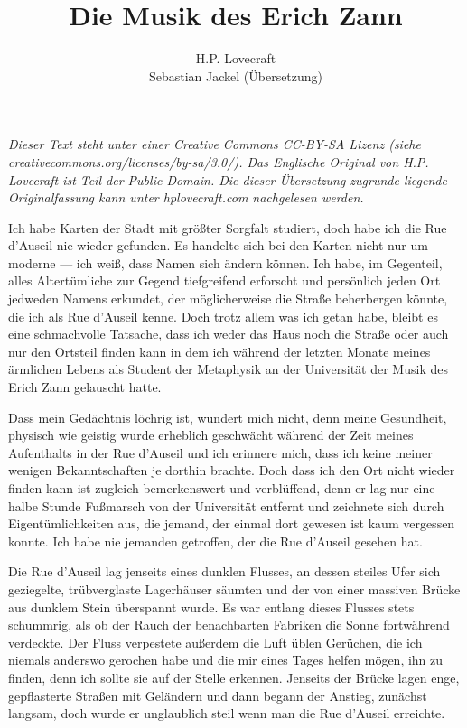 \documentclass[a4paper]{memoir}
\begin{document}
\title{Die Musik des Erich Zann}
\author{H.P. Lovecraft\\
		Sebastian Jackel (Übersetzung)}
\date{}
\maketitle

\textit{Dieser Text steht unter einer Creative Commons CC-BY-SA Lizenz
(siehe\\ creativecommons.org/licenses/by-sa/3.0/). Das Englische Original von H.P. Lovecraft ist Teil der Public Domain. Die dieser Übersetzung zugrunde liegende Originalfassung kann unter hplovecraft.com nachgelesen werden.}

\vspace{12pt}

Ich habe Karten der Stadt mit größter Sorgfalt studiert, doch habe ich die Rue d'Auseil nie wieder gefunden. Es handelte sich bei den Karten nicht nur um moderne --- ich weiß, dass Namen sich ändern können. Ich habe, im Gegenteil, alles Altertümliche zur Gegend tiefgreifend erforscht und persönlich jeden Ort jedweden Namens erkundet, der möglicherweise die Straße beherbergen könnte, die ich als Rue d'Auseil kenne. Doch trotz allem was ich getan habe, bleibt es eine schmachvolle Tatsache, dass ich weder das Haus noch die Straße oder auch nur den Ortsteil finden kann in dem ich während der letzten Monate meines ärmlichen Lebens als Student der Metaphysik an der Universität der Musik des Erich Zann gelauscht hatte.

Dass mein Gedächtnis löchrig ist, wundert mich nicht, denn meine Gesundheit, physisch wie geistig wurde erheblich geschwächt während der Zeit meines Aufenthalts in der Rue d'Auseil und ich erinnere mich, dass ich keine meiner wenigen Bekanntschaften je dorthin brachte. Doch dass ich den Ort nicht wieder finden kann ist zugleich bemerkenswert und verblüffend, denn er lag nur eine halbe Stunde Fußmarsch von der Universität entfernt und zeichnete sich durch Eigentümlichkeiten aus, die jemand, der einmal dort gewesen ist kaum vergessen konnte. Ich habe nie jemanden getroffen, der die Rue d'Auseil gesehen hat.

Die Rue d'Auseil lag jenseits eines dunklen Flusses, an dessen steiles Ufer sich geziegelte, trübverglaste Lagerhäuser säumten und der von einer massiven Brücke aus dunklem Stein überspannt wurde. Es war entlang dieses Flusses stets schummrig, als ob der Rauch der benachbarten Fabriken die Sonne fortwährend verdeckte. Der Fluss verpestete außerdem die Luft üblen Gerüchen, die ich niemals anderswo gerochen habe und die mir eines Tages helfen mögen, ihn zu finden, denn ich sollte sie auf der Stelle erkennen. Jenseits der Brücke lagen enge, gepflasterte Straßen mit Geländern und dann begann der Anstieg, zunächst langsam, doch wurde er unglaublich steil wenn man die Rue d'Auseil erreichte.
\end{document}
